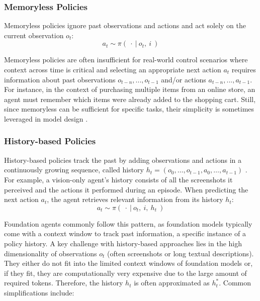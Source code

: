 \subsubsection{Memoryless Policies}\label{sec:agent_policy_memoryless}
Memoryless policies  ignore past observations and actions and act solely on the current observation $o_t$:
\begin{equation}
a_t \sim \pi(\ \cdot\ |\ o_t,\ i\ ) \label{eq:memoryless-policy}
\end{equation}

Memoryless policies are often insufficient for real-world control scenarios where context across time is critical and selecting an appropriate next action $a_t$ requires information about past observations $o_{t-n}, ..., o_{t-1}$ and/or actions $a_{t-n}, ..., a_{t-1}$. 
For instance, in the context of purchasing multiple items from an online store, an agent must remember which items were already added to the shopping cart.
Still, since memoryless can be sufficient for specific tasks, their simplicity is sometimes leveraged in model design .

\subsubsection{History-based Policies}\label{sec:agent_policy_history}
History-based policies track the past by adding observations and actions in a continuously growing sequence, called history $h_t=\left(o_{0},\hdots,o_{t-1},a_{0},\hdots,a_{t-1}\right)$ .
For example, a vision-only agent's history consists of all the screenshots it perceived and the actions it performed during an episode. When predicting the next action $a_t$, the agent retrieves relevant information from its history $h_t$:
%
\begin{equation}
a_t \sim \pi(\ \cdot\ |\ o_t,\ i,\ h_t\ ) \label{eq:history-based-policy}
\end{equation}

Foundation agents commonly follow this pattern, as foundation models typically come with a context window to track past information, a specific instance of a policy history.
A key challenge with history-based approaches lies in the high dimensionality of observations $o_t$ (often screenshots or long textual descriptions). They either do not fit into the limited context windows of foundation models or, if they fit, they are computationally very expensive due to the large amount of required tokens.
Therefore, the history $h_t$ is often approximated as $h_t^*$. Common simplifications include:

